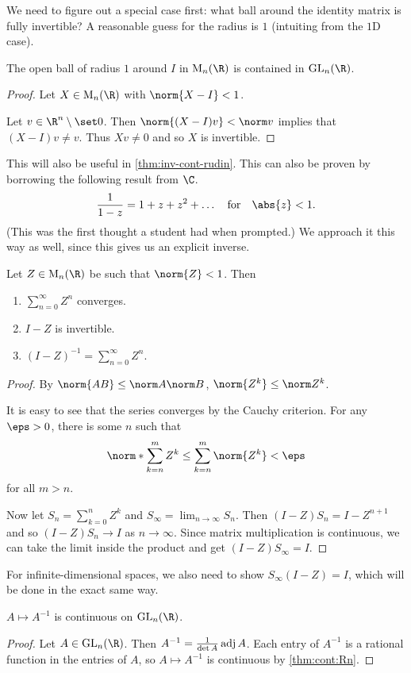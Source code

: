 We need to figure out a special case first: what ball around the identity
matrix is fully invertible?
A reasonable guess for the radius is $1$ (intuiting from the $1$D case).
\begin{lemma*} \label{thm:gln-open-i}
    The open ball of radius $1$ around $I$ in $\M_n(\R)$
    is contained in $\GL_n(\R)$.
\end{lemma*}
\begin{proof}
    Let $X \in \M_n(\R)$ with $\norm{X - I} < 1$.

    Let $v \in \R^n \setminus \set 0$.
    Then $\norm{(X - I)v} < \norm v$ implies that $(X - I)v \ne v$.
    Thus $Xv \ne 0$ and so $X$ is invertible.
\end{proof}
This will also be useful in \cref{thm:inv-cont-rudin}.
This can also be proven by borrowing the following result from $\C$. \[
    \frac1{1-z} = 1 + z + z^2 + \ldots \quad \text{for} \quad \abs{z} < 1.
\]
(This was the first thought a student had when prompted.)
We approach it this way as well, since this gives us an explicit inverse.
\begin{lemma*} \label{thm:inv-series}
    Let $Z \in \M_n(\R)$ be such that $\norm{Z} < 1$.
    Then
    \begin{enumerate}
        \item $\sum_{n=0}^\infty Z^n$ converges.
        \item $I - Z$ is invertible.
        \item $(I - Z)^{-1} = \sum_{n=0}^\infty Z^n$.
    \end{enumerate}
\end{lemma*}
\begin{proof}
    By $\norm{AB} \le \norm A \norm B$, $\norm{Z^k} \le \norm Z^k$.

    It is easy to see that the series converges by the Cauchy criterion.
    For any $\eps > 0$, there is some $n$ such that \[
        \norm*{\sum_{k=n}^m Z^k} \le \sum_{k=n}^m \norm{Z^k} < \eps
    \]
    for all $m > n$.

    Now let $S_n = \sum_{k=0}^n Z^k$ and
    $S_\infty = \lim_{n \to \infty} S_n$.
    Then $(I - Z)S_n = I - Z^{n+1}$ and so
    $(I - Z)S_n \to I$ as $n \to \infty$.
    Since matrix multiplication is continuous, we can take the limit
    inside the product and get $(I - Z)S_\infty = I$.
\end{proof}
\begin{remark}
    For infinite-dimensional spaces, we also need to show
    $S_\infty (I - Z) = I$, which will be done in the exact same way.
\end{remark}

\begin{proposition*} \label{thm:inv-cont}
    $A \mapsto A^{-1}$ is continuous on $\GL_n(\R)$.
\end{proposition*}
\begin{proof}
    Let $A \in \GL_n(\R)$.
    Then $A^{-1} = \frac1{\det A} \operatorname{adj} A$.
    Each entry of $A^{-1}$ is a rational function in the entries of $A$,
    so $A \mapsto A^{-1}$ is continuous by \cref{thm:cont:Rn}.
\end{proof}
